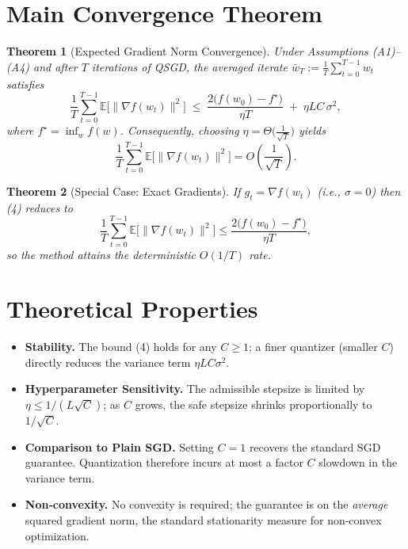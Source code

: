 \documentclass{article}
\newtheorem{theorem}{Theorem}
\newcommand{\E}{\mathbb{E}}
\begin{document}
\section*{Main Convergence Theorem}
\begin{theorem}[Expected Gradient Norm Convergence]\label{thm:main}
Under Assumptions (A1)–(A4) and after $T$ iterations of QSGD, the
averaged iterate $\bar w_T:=\frac1T\sum_{t=0}^{T-1}w_t$ satisfies
\[
\frac{1}{T}\sum_{t=0}^{T-1}\E\!\big[\|\nabla f(w_t)\|^{2}\big]
\;\le\;
\frac{2\big(f(w_0)-f^{\star}\big)}{\eta T}
\;+\;
\eta L C\,\sigma^{2},                                            \tag{4}
\]
where $f^{\star}=\inf_{w}f(w)$.
Consequently, choosing $\eta = \Theta\!\big(\tfrac{1}{\sqrt{T}}\big)$ yields
\[
\frac{1}{T}\sum_{t=0}^{T-1}\E\!\big[\|\nabla f(w_t)\|^{2}\big]
= O\!\left(\frac{1}{\sqrt{T}}\right).
\]
\end{theorem}

\begin{theorem}[Special Case: Exact Gradients]
If $g_t=\nabla f(w_t)$ (i.e., $\sigma=0$) then (4) reduces to
\[
\frac{1}{T}\sum_{t=0}^{T-1}\E\!\big[\|\nabla f(w_t)\|^{2}\big]
\le \frac{2\big(f(w_0)-f^{\star}\big)}{\eta T},
\]
so the method attains the deterministic $O(1/T)$ rate.
\end{theorem}

\section*{Theoretical Properties}
\begin{itemize}[leftmargin=*]
\item \textbf{Stability.}  The bound (4) holds for any $C\ge1$; a finer quantizer (smaller $C$) directly reduces the variance term $\eta L C\sigma^{2}$.
\item \textbf{Hyperparameter Sensitivity.}  The admissible stepsize is limited by $\eta\le 1/(L\sqrt{C})$; as $C$ grows, the safe stepsize shrinks proportionally to $1/\sqrt{C}$.
\item \textbf{Comparison to Plain SGD.}  Setting $C=1$ recovers the standard SGD guarantee.  Quantization therefore incurs at most a factor $C$ slowdown in the variance term.
\item \textbf{Non‑convexity.}  No convexity is required; the guarantee is on the \emph{average} squared gradient norm, the standard stationarity measure for non‑convex optimization.
\end{itemize}
\end{document}
